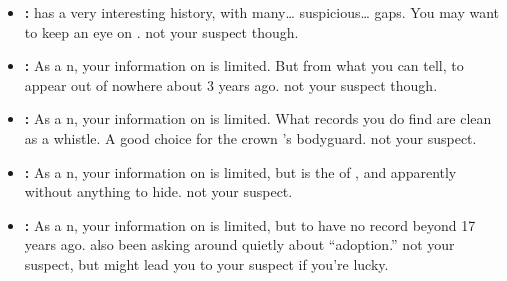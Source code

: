 \documentclass[green]{NeptuneBall}
\begin{document}
\begin{itemize}
	\item \textbf{\cManta{\full}:} \cManta{} has a very interesting history, with many\ldots{} suspicious\ldots{} gaps. You may want to keep an eye on \cManta{\them}. \cManta{\They} \cManta{\are} not your suspect though.
	
	\item \textbf{\cDiplomat{\full}:} As a \pPacifica{}n, your information on \cDiplomat{} is limited. But from what you can tell, \cDiplomat{\they}  to appear out of nowhere about 3 years ago. \cDiplomat{\They} \cDiplomat{\are} not your suspect though.
	
	\item \textbf{\cBodyguard{\full}:} As a \pPacifica{}n, your information on \cBodyguard{} is limited. What records you do find are clean as a whistle. A good choice for the crown \cPrince{\prince}'s bodyguard. \cBodyguard{\They} \cBodyguard{\are} not your suspect.
	
	\item \textbf{\cPrince{\full}:} As a \pPacifica{}n, your information on \cPrince{} is limited, but \cPrince{} is the \cPrince{\Prince} of \pPacifica{}, and apparently without anything to hide. \cPrince{\They} \cPrince{\are} not your suspect.
	
	\item \textbf{\cSpy{\full}:} As a \pPacifica{}n, your information on \cSpy{} is limited, but \cSpy{\they}  to have no record beyond 17 years ago. \cSpy{\They} \cSpy{\have} also been asking around quietly about ``adoption.'' \cSpy{\They} \cSpy{\are} not your suspect, but might lead you to your suspect if you're lucky.
\end{itemize}
\end{document}
